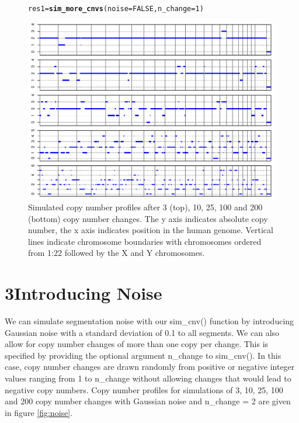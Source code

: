 \documentclass[12pt]{article}\usepackage[]{graphicx}\usepackage[]{color}
\makeatletter
\newcommand{\hlnum}[1]{\textcolor[rgb]{0.686,0.059,0.569}{#1}}%
\newcommand{\hlstd}[1]{\textcolor[rgb]{0.345,0.345,0.345}{#1}}%
\newcommand{\hlkwb}[1]{\textcolor[rgb]{0.69,0.353,0.396}{#1}}%
\newcommand{\hlkwc}[1]{\textcolor[rgb]{0.333,0.667,0.333}{#1}}%
\newcommand{\hlkwd}[1]{\textcolor[rgb]{0.737,0.353,0.396}{\textbf{#1}}}%
\newenvironment{kframe}{%
 \def\at@end@of@kframe{}%
 \ifinner\ifhmode%
  \def\at@end@of@kframe{\end{minipage}}%
  \begin{minipage}{\columnwidth}%
 \fi\fi%
 \def\FrameCommand##1{\hskip\@totalleftmargin \hskip-\fboxsep
 \colorbox{shadecolor}{##1}\hskip-\fboxsep
     \hskip-\linewidth \hskip-\@totalleftmargin \hskip\columnwidth}%
 \MakeFramed {\advance\hsize-\width
   \@totalleftmargin\z@ \linewidth\hsize
   \@setminipage}}%
 {\par\unskip\endMakeFramed%
 \at@end@of@kframe}
\newenvironment{knitrout}{}{} %
\makeatother
\begin{document}
\begin{figure}[h!]
  \centering
\begin{knitrout}
\color{fgcolor}\begin{kframe}
\begin{alltt}
\hlstd{res1} \hlkwb{=} \hlkwd{sim_more_cnvs}\hlstd{(} \hlkwc{noise}\hlstd{=}\hlnum{FALSE}\hlstd{,} \hlkwc{n_change}\hlstd{=}\hlnum{1}\hlstd{)}
\end{alltt}
\end{kframe}
\includegraphics[width=.95\linewidth]{figure/unnamed-chunk-5-1} 

\end{knitrout}
\caption{Simulated copy number profiles after 3 (top), 10, 25, 100 and 200 (bottom) copy number changes. The y axis indicates absolute copy number, the x axis indicates position in the human genome. Vertical lines indicate chromosome boundaries with chromosomes ordered from 1:22 followed by the X and Y chromosomes.}
\label{fig:no_noise}
\end{figure}

\newpage
\section*{3\quad Introducing Noise}

We can simulate segmentation noise with our sim\_cnv() function by introducing Gaussian noise with a standard deviation of 0.1 to all segments. We can also allow for copy number changes of more than one copy per change. This is specified by providing the optional argument n\_change to sim\_cnv(). In this case, copy number changes are drawn randomly from positive or negative integer values ranging from 1 to n\_change without allowing changes that would lead to negative copy numbers. Copy number profiles for simulations of 3, 10, 25, 100 and 200 copy number changes with Gaussian noise and n\_change = 2 are given in figure \ref{fig:noise}.
\end{document}
